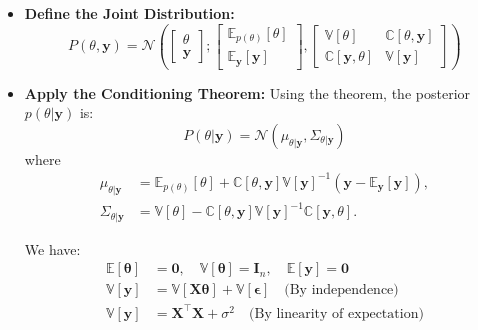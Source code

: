 \begin{itemize}
    \item \textbf{Define the Joint Distribution:} 
          \[
              P(\theta, \boldsymbol{y}) = \mathcal{N}\left(
              \begin{bmatrix} \theta \\ \boldsymbol{y} \end{bmatrix};
              \begin{bmatrix} \mathbb{E}_{p(\theta)}[\theta] \\ \mathbb{E}_{\boldsymbol{y}}[\boldsymbol{y}] \end{bmatrix},
              \begin{bmatrix} \mathbb{V}[\theta] & \mathbb{C}[\theta, \boldsymbol{y}] \\ \mathbb{C}[\boldsymbol{y}, \theta] & \mathbb{V}[\boldsymbol{y}] \end{bmatrix}
              \right)
          \]

    \item \textbf{Apply the Conditioning Theorem:}
          Using the theorem, the posterior \( p(\theta|\boldsymbol{y}) \) is:
          \[
              P(\theta|\boldsymbol{y}) = \mathcal{N}\left( \mu_{\theta|\boldsymbol{y}}, \Sigma_{\theta|\boldsymbol{y}} \right)
          \]
          where
          \begin{align*}
              \mu_{\theta|\boldsymbol{y}}    & = \mathbb{E}_{p(\theta)}[\theta] + \mathbb{C}[\theta, \boldsymbol{y}] \mathbb{V}[\boldsymbol{y}]^{-1} (\boldsymbol{y} - \mathbb{E}_{\boldsymbol{y}}[\boldsymbol{y}]), \\
              \Sigma_{\theta|\boldsymbol{y}} & = \mathbb{V}[\theta] - \mathbb{C}[\theta, \boldsymbol{y}] \mathbb{V}[\boldsymbol{y}]^{-1} \mathbb{C}[\boldsymbol{y}, \theta].
          \end{align*}

          We have:
          \begin{align*}
            \mathbb{E}[\bm{\theta}] &= \bm{0}, \quad \mathbb{V}[\bm{\theta}] = \bm{I}_n, \quad \mathbb{E}[\bm{y}] = \bm{0} \\
            \mathbb{V}[\bm{y}] &= \mathbb{V}[\bm{X\theta}] + \mathbb{V}[\bm{\epsilon}] \quad \text{(By independence)} \\
            \mathbb{V}[\bm{y}] &= \bm{X}^\top \bm{X} + \sigma^2 \quad \text{(By linearity of expectation)}
            \end{align*}


\end{itemize}
